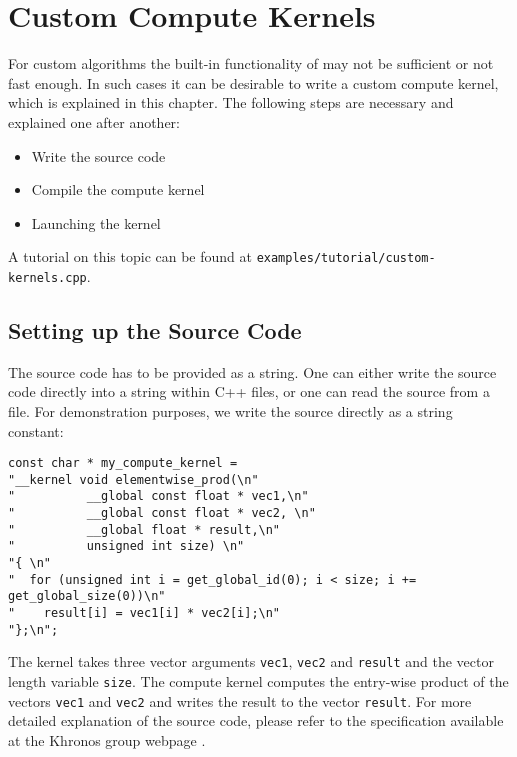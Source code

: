 

\chapter{Custom Compute Kernels} \label{chap:custom}

For custom algorithms the built-in functionality of {\ViennaCL} may not be sufficient or not fast enough. In such cases it can be desirable to write a custom {\OpenCL} compute kernel, which is explained in this chapter. The following steps are necessary and explained one after another:
\begin{itemize}
 \item Write the {\OpenCL} source code
 \item Compile the compute kernel
 \item Launching the kernel
\end{itemize}
A tutorial on this topic can be found at \texttt{examples/tutorial/custom-kernels.cpp}.


\section{Setting up the Source Code}
The {\OpenCL} source code has to be provided as a string. One can either write the source code directly into a string within C++ files, or one can read the {\OpenCL} source from a file. For demonstration purposes, we write the source directly as a string constant:
\begin{lstlisting}
const char * my_compute_kernel = 
"__kernel void elementwise_prod(\n"
"          __global const float * vec1,\n"
"          __global const float * vec2, \n"
"          __global float * result,\n"
"          unsigned int size) \n"
"{ \n"
"  for (unsigned int i = get_global_id(0); i < size; i += get_global_size(0))\n"
"    result[i] = vec1[i] * vec2[i];\n"
"};\n";
\end{lstlisting}
The kernel takes three vector arguments \lstinline{vec1}, \lstinline{vec2} and \lstinline{result} and the vector length variable \lstinline{size}. The compute kernel computes the entry-wise product of the vectors \lstinline|vec1| and \lstinline|vec2| and writes the result to the vector \lstinline|result|. For more detailed explanation of the {\OpenCL} source code, please refer to the specification available at the Khronos group webpage \cite{khronoscl}.


